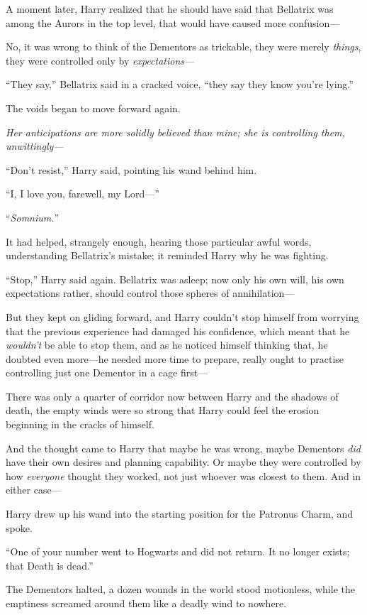 A moment later, Harry realized that he should have said that Bellatrix was among the Aurors in the top level, that would have caused more confusion—

No, it was wrong to think of the Dementors as trickable, they were merely \emph{things}, they were controlled only by \emph{expectations—}

“They say,” Bellatrix said in a cracked voice, “they say they know you’re lying.”

The voids began to move forward again.

\emph{Her anticipations are more solidly believed than mine; she is controlling them, unwittingly—}

“Don’t resist,” Harry said, pointing his wand behind him.

“I, I love you, farewell, my Lord—”

“\emph{Somnium.}”

It had helped, strangely enough, hearing those particular awful words, understanding Bellatrix’s mistake; it reminded Harry why he was fighting.

“Stop,” Harry said again. Bellatrix was asleep; now only his own will, his own expectations rather, should control those spheres of annihilation—

But they kept on gliding forward, and Harry couldn’t stop himself from worrying that the previous experience had damaged his confidence, which meant that he \emph{wouldn’t} be able to stop them, and as he noticed himself thinking that, he doubted even more—he needed more time to prepare, really ought to practise controlling just one Dementor in a cage first—

There was only a quarter of corridor now between Harry and the shadows of death, the empty winds were so strong that Harry could feel the erosion beginning in the cracks of himself.

And the thought came to Harry that maybe he was wrong, maybe Dementors \emph{did} have their own desires and planning capability. Or maybe they were controlled by how \emph{everyone} thought they worked, not just whoever was closest to them. And in either case—

Harry drew up his wand into the starting position for the Patronus Charm, and spoke.

“One of your number went to Hogwarts and did not return. It no longer exists; that Death is dead.”

The Dementors halted, a dozen wounds in the world stood motionless, while the emptiness screamed around them like a deadly wind to nowhere.

